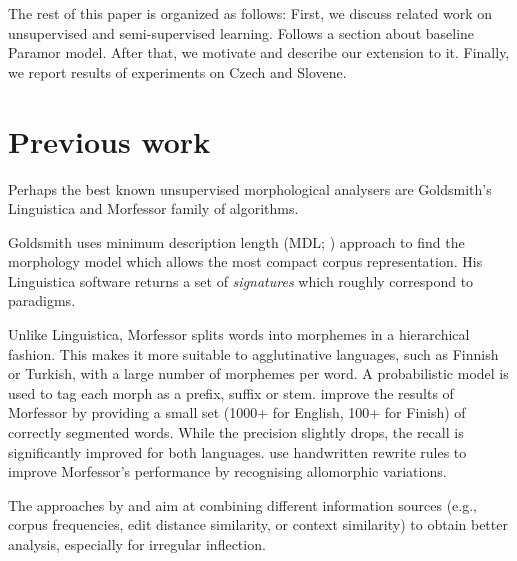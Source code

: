 \documentclass{itatnew}
\begin{document}

The rest of this paper is organized as follows: First, we discuss related work on unsupervised and semi-supervised learning. Follows a section about baseline Paramor model. After that, we motivate and describe our extension to it. Finally, we report results of experiments on Czech and Slovene.


\section{Previous work}

Perhaps the best known unsupervised morphological analysers are Goldsmith's Linguistica \cite{goldsmith01} and Morfessor \cite{creutz-lagus-2002-udm,creutz-lagus-2005,creutz07} family of algorithms. %

Gold\-smith uses minimum description length (MDL; \cite{rissanen-1989}) approach to find the morphology model which allows the most compact corpus representation. His Linguistica software returns a set of \emph{signatures} which roughly correspond to paradigms.


Unlike Linguistica, Morfessor splits words into morphemes in a hierarchical fashion. This makes it more suitable to agglutinative languages, such as Finnish or Turkish, with a large number of morphemes per word.
A probabilistic model is used to tag each morph as a prefix, suffix or stem.
%
\cite{kohonen-etal-2010} improve the results of Morfessor by providing a small set (1000+ for English, 100+ for Finish) of correctly segmented words.  While the precision slightly drops, the recall is significantly improved for both languages.
%
\cite{tepper10} use handwritten rewrite rules to improve Morfes\-sor's performance by recognising allomorphic variations.

The approaches by \cite{yarowsky00} and \cite{schone01} aim at combining different information sources (e.g., corpus frequencies, edit distance similarity, or context similarity) to obtain better analysis, especially for irregular inflection.
\end{document}
